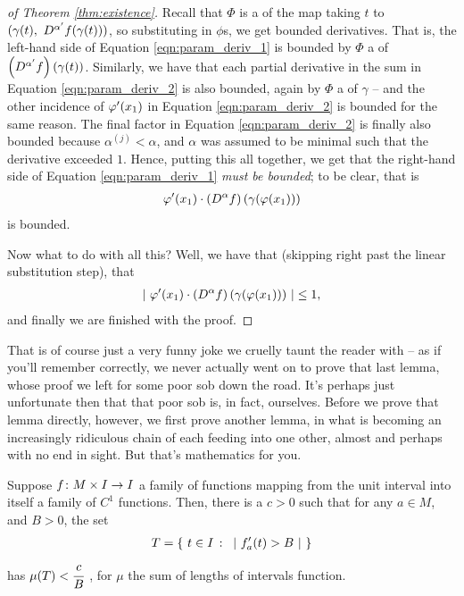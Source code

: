 \begin{proof}[of Theorem \ref{thm:existence}]
    Recall that $\Phi$ is a \cellrparam of the map taking $t$ to $(\gamma(t), \ D^{\alpha^{\prime}} f(\gamma(t)))$, so substituting in $\phi$s, we get bounded derivatives. That is, the left-hand side of Equation \ref{eqn:param_deriv_1} is bounded by $\Phi$ a \cellrparam of $\left( D^{\alpha^{\prime}} f \right)(\gamma(t))$. Similarly, we have that each partial derivative in the sum in Equation \ref{eqn:param_deriv_2} is also bounded, again by $\Phi$ a \cellrparam of $\gamma$ -- and the other incidence of $\varphi^{\prime}(x_1)$ in Equation \ref{eqn:param_deriv_2} is bounded for the same reason. The final factor in Equation \ref{eqn:param_deriv_2} is finally also bounded because $\alpha^{(j)} < \alpha$, and $\alpha$ was assumed to be minimal such that the derivative exceeded $1$. Hence, putting this all together, we get that the right-hand side of Equation \ref{eqn:param_deriv_1} \emph{must be bounded}; to be clear, that is
      \begin{align*}
        \varphi^{\prime}(x_1) \cdot \left( D^{\alpha} f \right) \left( \gamma (\varphi(x_1)) \right)
      \end{align*}
    is bounded.

    Now what to do with all this? Well, we have that (skipping right past the linear substitution step), that
      \begin{align*}
        \left\vert \  \varphi^{\prime}(x_1) \cdot \left( D^{\alpha} f \right) \left( \gamma (\varphi(x_1)) \right)  \ \right\vert \leq 1,
      \end{align*}
      and finally we are finished with the proof.
    \end{proof}


That is of course just a very funny joke we cruelly taunt the reader with -- as if you'll remember correctly, we never actually went on to prove that last lemma, whose proof we left for some poor sob down the road. It's perhaps just unfortunate then that that poor sob is, in fact, ourselves. Before we prove that lemma directly, however, we first prove another lemma, in what is becoming an increasingly ridiculous chain of \lemmas each feeding into one other, almost and perhaps with no end in sight. But that's mathematics for you.

\begin{lemma}
  Suppose $f \colon M \times I \to I$ a family of functions mapping from the unit interval into itself a  family of $C^1$ functions. Then, there is a $c > 0$ such that for any $a \in M$, and $B > 0$, the set
    \begin{align*}
      T = \left\{ \ t \in I \ \colon \ \lvrv{ \pri{f_a}(t) > B } \ \right\}
    \end{align*}
    has $\mu(T) < \cfrac{c}{B} \ $, for $\mu$ the sum of lengths of intervals function.
    \label{lem:small_lemma_in_support}
  \end{lemma}

